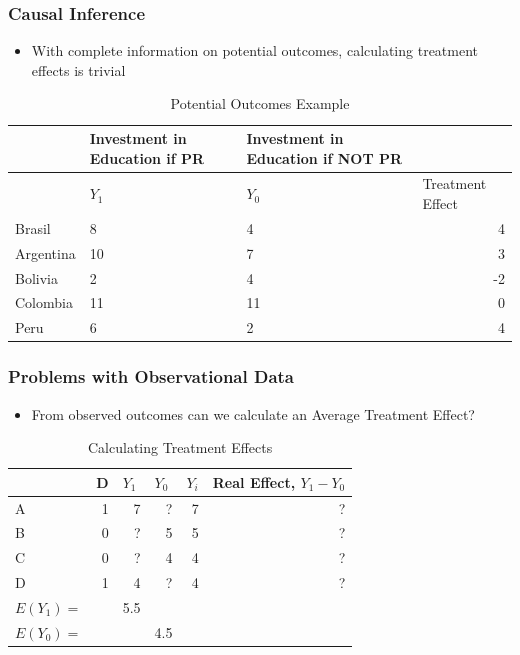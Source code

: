 \documentclass[xcolor=x11names,compress]{beamer}\usepackage[]{graphicx}\usepackage[]{color}
\renewcommand{\(}{\begin{columns}}
\renewcommand{\)}{\end{columns}}
\newcommand{\<}[1]{\begin{column}{#1}}
\renewcommand{\>}{\end{column}}
\begin{document}
\begin{frame}
\frametitle{Causal Inference}
\begin{itemize}
\item With complete information on potential outcomes, calculating treatment effects is trivial
\end{itemize}
\begin{table}[htbp]
  \centering
  \caption{Potential Outcomes Example}
    \begin{tabular}{|l|p{2.4cm}|p{2.4cm}|r|}
    \hline
          & \multicolumn{1}{p{2.4cm}|}{Investment in Education if PR} & \multicolumn{1}{p{2.4cm}|}{Investment in Education if NOT PR} &  \bigstrut\\
    \hline
          & \multicolumn{1}{l|}{$Y_1$} & \multicolumn{1}{l|}{$Y_0$} & \multicolumn{1}{l|}{Treatment Effect} \bigstrut\\
    \hline
    Brasil & 8     & 4     & 4 \bigstrut\\
    \hline
    Argentina & 10    & 7     & 3 \bigstrut\\
    \hline
    Bolivia & 2     & 4     & -2 \bigstrut\\
    \hline
    Colombia & 11    & 11    & 0 \bigstrut\\
    \hline
    Peru & 6     & 2     & 4 \bigstrut\\
    \hline
    \end{tabular}%
  \label{tab:addlabel}%
\end{table}%
\end{frame}


\begin{frame}
\frametitle{Problems with Observational Data}
\begin{itemize}
\item From observed outcomes can we calculate an Average Treatment Effect?
\pause
\end{itemize}
\begin{table}[htbp]
  \centering
  \caption{Calculating Treatment Effects}
    \begin{tabular}{|l|r|r|r|r|r|}
    \hline
          & \multicolumn{1}{l|}{D} & \multicolumn{1}{l|}{$Y_1$} & \multicolumn{1}{l|}{$Y_0$} & \multicolumn{1}{l|}{$Y_i$} & \multicolumn{1}{l|}{Real Effect, $Y_1 - Y_0$} \bigstrut\\
    \hline
    A     & 1     & \cellcolor{teal}7     & ?     & 7     & ? \bigstrut\\
    \hline
    B     & 0     & ?     & \cellcolor{teal}5     & 5     & ? \bigstrut\\
    \hline
    C     & 0     & ?     & \cellcolor{teal}4     & 4     & ? \bigstrut\\
    \hline
    D     & 1     & \cellcolor{teal}4     & ?     & 4     & ? \bigstrut\\
    \hline \pause
    $E(Y_1)=$ & & 5.5 & & \bigstrut\\
    \hline
    $E(Y_0)=$ & &  & 4.5 & \bigstrut\\
    \hline
    \end{tabular}%
  \label{tab:addlabel}%
\end{table}%
\end{frame}
\end{document}
